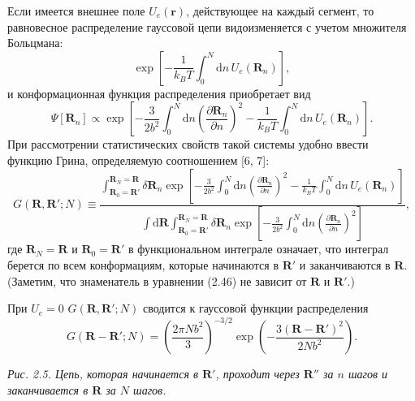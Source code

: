 \documentclass[12pt,a4paper]{article}
\begin{document}
Если имеется внешнее поле $U_e(\boldsymbol{r})$, действующее на каждый сегмент, то равновесное распределение гауссовой цепи видоизменяется с учетом множителя Больцмана:
\begin{equation}
\exp\left[-\frac{1}{k_B T}\int_0^N\!\mathrm{d}n\,U_e(\boldsymbol{R}_n)\right], \tag{2.44}
\end{equation}
и конформационная функция распределения приобретает вид
\begin{equation}
\Psi[\boldsymbol{R}_n] \propto \exp\left[-\frac{3}{2b^2}\int_0^N\!\mathrm{d}n\left(\frac{\partial\boldsymbol{R}_n}{\partial n}\right)^2 - \frac{1}{k_B T}\int_0^N\!\mathrm{d}n\,U_e(\boldsymbol{R}_n)\right]. \tag{2.45}
\end{equation}
При рассмотрении статистических свойств такой системы удобно ввести функцию Грина, определяемую соотношением [6, 7]:
\begin{equation}
G(\boldsymbol{R}, \boldsymbol{R}'; N) \equiv \frac{\displaystyle\int_{\boldsymbol{R}_0 = \boldsymbol{R}'}^{\boldsymbol{R}_N = \boldsymbol{R}}\!\delta\boldsymbol{R}_n\exp\left[-\frac{3}{2b^2}\int_0^N\!\mathrm{d}n\left(\frac{\partial\boldsymbol{R}_n}{\partial n}\right)^2 - \frac{1}{k_B T}\int_0^N\!\mathrm{d}n\,U_e(\boldsymbol{R}_n)\right]}{\displaystyle\int\!\mathrm{d}\boldsymbol{R}\int_{\boldsymbol{R}_0 = \boldsymbol{R}'}^{\boldsymbol{R}_N = \boldsymbol{R}}\!\delta\boldsymbol{R}_n\exp\left[-\frac{3}{2b^2}\int_0^N\!\mathrm{d}n\left(\frac{\partial\boldsymbol{R}_n}{\partial n}\right)^2\right]}, \tag{2.46}
\end{equation}
где $\boldsymbol{R}_N = \boldsymbol{R}$ и $\boldsymbol{R}_0 = \boldsymbol{R}'$ в функциональном интеграле означает, что интеграл берется по всем конформациям, которые начинаются в $\boldsymbol{R}'$ и заканчиваются в $\boldsymbol{R}$. (Заметим, что знаменатель в уравнении (2.46) не зависит от $\boldsymbol{R}$ и $\boldsymbol{R}'$.)

При $U_e = 0$ $G(\boldsymbol{R}, \boldsymbol{R}'; N)$ сводится к гауссовой функции распределения
\begin{equation}
G(\boldsymbol{R} - \boldsymbol{R}'; N) = \left(\frac{2\pi N b^2}{3}\right)^{-3/2}\exp\left(-\frac{3(\boldsymbol{R} - \boldsymbol{R}')^2}{2Nb^2}\right). \tag{2.47}
\end{equation}

\begin{center}
\textit{Рис. 2.5. Цепь, которая начинается в $\boldsymbol{R}'$, проходит через $\boldsymbol{R}''$ за $n$ шагов и заканчивается в $\boldsymbol{R}$ за $N$ шагов.}
\end{center}
\end{document}
